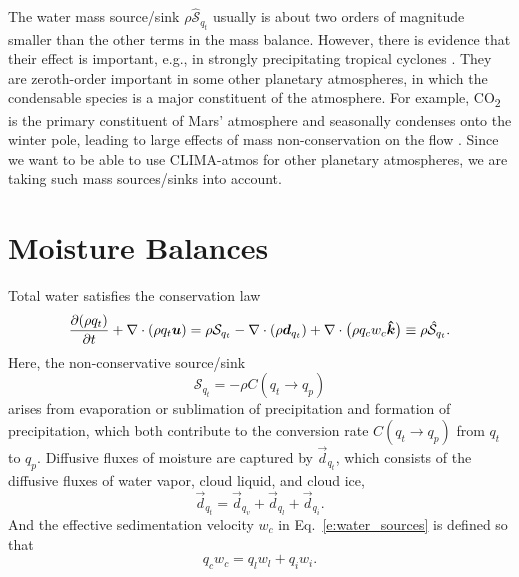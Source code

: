 \documentclass{report}
\begin{document}
The water mass source/sink $\rho \mathcal{\hat S}_{q_t}$ usually is about two orders of magnitude smaller than the other terms in the mass balance. However, there is evidence that their effect is important, e.g., in strongly precipitating tropical cyclones \citep{Qiu93a,Lackmann04a}. They are zeroth-order important in some other planetary atmospheres, in which the condensable species is a major constituent of the atmosphere. For example, CO\textsubscript{2} is the primary constituent of Mars' atmosphere and seasonally condenses onto the winter pole, leading to large effects of mass non-conservation on the flow \cite[e.g.,][]{Soto15a}. Since we want to be able to use CLIMA-atmos for other planetary atmospheres, we are taking such mass sources/sinks into account.

\section{Moisture Balances}\label{s:moisture_balance}

Total water satisfies the conservation law
\begin{equation}
\frac{\partial (\rho q_t)}{\partial t} + \nabla \cdot (\rho q_t \boldsymbol{{u}})
= \rho \mathcal{S}_{q_t} - \nabla \cdot (\rho \boldsymbol{{d}}_{q_t}) + \nabla \cdot \bigl(\rho q_c w_c \boldsymbol{{\hat k}}  \bigr)
\equiv \rho \mathcal{\hat S}_{q_t}.   
\label{e:governing_equations/moisture}
\end{equation}
Here, the non-conservative source/sink
\begin{equation}\label{e:water_sources}
     \mathcal{S}_{q_t} = - \rho C(q_t \rightarrow q_p)
\end{equation}
arises from evaporation or sublimation of precipitation and formation of precipitation, which both contribute to the conversion rate $C(q_t \rightarrow q_p)$ from $q_t$ to $q_p$. Diffusive fluxes of moisture are captured by $\vec{d}_{q_t}$, which consists of the diffusive fluxes of water vapor, cloud liquid, and cloud ice, 
\begin{equation}
    \vec{d}_{q_t} =\vec{d}_{q_v} + \vec{d}_{q_l} + \vec{d}_{q_i}.
\end{equation}
And the effective sedimentation velocity $w_c$ in Eq.~\eqref{e:water_sources} is defined so that 
\begin{equation}
    q_c w_c = q_l w_l + q_i w_i.
\end{equation}
\end{document}
